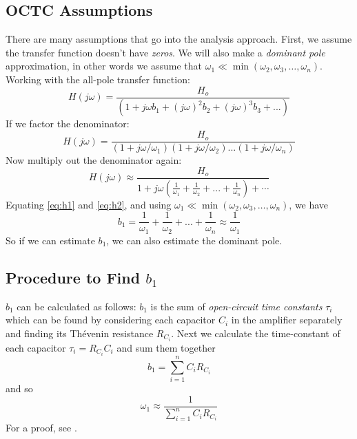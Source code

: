 \subsection{OCTC Assumptions}
There are many assumptions that go into the analysis approach.  First, we assume the transfer function doesn't have \textit{zeros}.  We will also make a  \textit{dominant pole} approximation, in other words we assume that $\omega_1 \ll \min(\omega_2, \omega_3, \dots, \omega_n)$. Working with the all-pole transfer function:
\begin{equation}
	H(j\omega ) = \frac{{{H_o}}}{{\left( {1 + j\omega {b_1} + {{(j\omega )}^2}{b_2} + {{(j\omega )}^3}{b_3} + ...} \right)}} 
	\label{eq:h1}
\end{equation}
If we factor the denominator:
\begin{equation}
	H(j\omega ) = \frac{{{H_o}}}{{\left( {1 + j\omega /{\omega _1}} \right)\left( {1 + j\omega /{\omega _2}} \right)...\left( {1 + j\omega /{\omega _n}} \right)}}
\end{equation}
Now multiply out the denominator again:
\begin{equation}  
	H(j\omega ) \approx \frac{{{H_o}}}{{1 + j\omega \left( {\frac{1}{{{\omega _1}}} + \frac{1}{{{\omega _2}}} + ... + \frac{1}{{{\omega _n}}}} \right) + \cdots }}
\label{eq:h2}
\end{equation}
Equating \ref{eq:h1} and \ref{eq:h2}, and using $\omega_1 \ll \min(\omega_2, \omega_3, \dots, \omega_n)$, we have
\begin{equation} 
	{b_1} = \frac{1}{{{\omega _1}}} + \frac{1}{{{\omega _2}}} + ... + \frac{1}{{{\omega _n}}} \approx \frac{1}{{{\omega _1}}}
\end{equation}
So if we can estimate $b_1$, we can also estimate the dominant pole.
\subsection{Procedure to Find $b_1$}
$b_1$ can be calculated as follows:  $b_1$ is the sum of \textit{open-circuit time constants} $\tau_i$ which can be found by considering each capacitor $C_i$ in the amplifier separately and finding its Thévenin resistance $R_{C_i}$.  Next we calculate the time-constant of each capacitor $\tau_i = R_{C_i} C_i$ and sum them together
\begin{equation}
	b_1 = \sum_{i=1}^n C_i R_{C_i} 
\end{equation}
and so
\begin{equation}
 	\omega_1 \approx \frac{1}{  \sum_{i=1}^n C_i R_{C_i}  }
\end{equation}
For a proof, see \cite{GrayMeyer}. %
